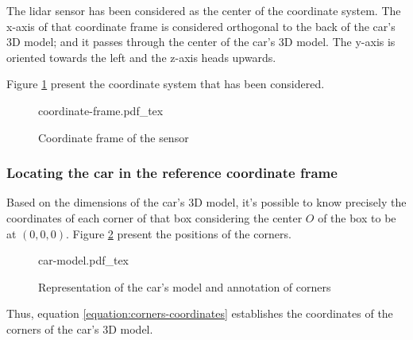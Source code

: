 \documentclass{scrartcl}
\newcommand{\fig}[3][100]{
  \def\svgwidth{#1mm}
  {#3.pdf_tex}
}
\begin{document}
    The lidar sensor has been considered as the center of the coordinate
    system. The x-axis of that coordinate frame is considered orthogonal to
    the back of the car's 3D model; and it passes through the center of the
    car's 3D model. The y-axis is oriented towards the left and the z-axis
    heads upwards.

    Figure \ref{figure:coordinate-frame} present the coordinate system that
    has been considered.

    \begin{figure}[h]
      \centering
      \fig{pictures/coordinate-frame}{coordinate-frame}
      \caption{Coordinate frame of the sensor}
      \label{figure:coordinate-frame}
    \end{figure}

    \subsubsection{Locating the car in the reference coordinate frame}

    Based on the dimensions of the car's 3D model, it's possible to know
    precisely the coordinates of each corner of that box considering the
    center $O$ of the box to be at $(0, 0, 0)$. Figure \ref{figure:car-model}
    present the positions of the corners.

    \begin{figure}[h]
      \centering
      \fig[75]{pictures/car-model}{car-model}
      \caption{Representation of the car's model and annotation of corners}
      \label{figure:car-model}
    \end{figure}

    Thus, equation \ref{equation:corners-coordinates} establishes the
    coordinates of the corners of the car's 3D model.
\end{document}
